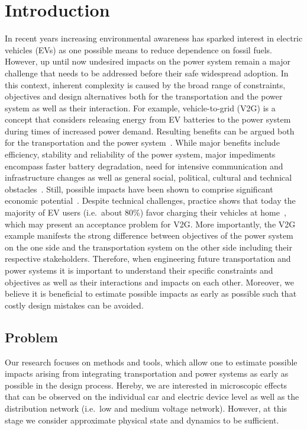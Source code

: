\section{Introduction}

In recent years increasing environmental awareness has sparked interest in electric vehicles (EVs) as one possible means to reduce dependence on fossil fuels. However, up until now undesired impacts on the power system remain a major challenge that needs to be addressed before their safe widespread adoption. In this context, inherent complexity is caused by the broad range of constraints, objectives and design alternatives both for the transportation and the power system as well as their interaction. For example, vehicle-to-grid (V2G) is a concept that considers releasing energy from EV batteries to the power system during times of increased power demand. Resulting benefits can be argued both for the transportation and the power system~\cite{tomic2007using}. While major benefits include efficiency, stability and reliability of the power system, major impediments encompass faster battery degradation, need for intensive communication and infrastructure changes as well as general social, political, cultural and technical obstacles~\cite{yilmaz2013review}. Still, possible impacts have been shown to comprise significant economic potential~\cite{peterson2010economics,erdinc2014economic}. Despite technical challenges, practice shows that today the majority of EV users (i.e.\ about 80\%) favor charging their vehicles at home~\cite{haines2009simulation}, which may present an acceptance problem for V2G. More importantly, the V2G example manifests the strong difference between objectives of the power system on the one side and the transportation system on the other side including their respective stakeholders. Therefore, when engineering future transportation and power systems it is important to understand their specific constraints and objectives as well as their interactions and impacts on each other. Moreover, we believe it is beneficial to estimate possible impacts as early as possible such that costly design mistakes can be avoided.

\subsection{Problem}

Our research focuses on methods and tools, which allow one to estimate possible impacts arising from integrating  transportation and power systems as early as possible in the design process. Hereby, we are interested in microscopic effects that can be observed on the individual car and electric device level as well as the distribution network (i.e.\ low and medium voltage network). However, at this stage we consider approximate physical state and dynamics to be sufficient.

